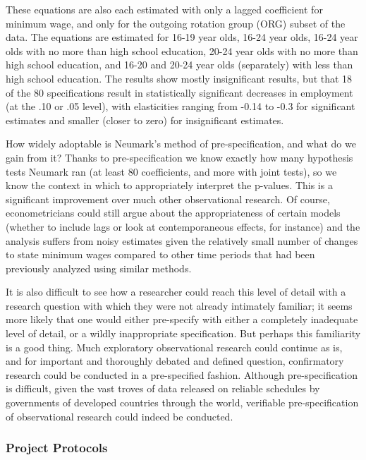 \documentclass[12pt] {article}
\begin{document}
These equations are also each estimated with only a lagged coefficient for minimum wage, and only for the outgoing rotation group (ORG) subset of the data. The equations are estimated for 16-19 year olds, 16-24 year olds, 16-24 year olds with no more than high school education, 20-24 year olds with no more than high school education, and 16-20 and 20-24 year olds (separately) with less than high school education. The results show mostly insignificant results, but that 18 of the 80 specifications result in statistically significant decreases in employment (at the .10 or .05 level), with elasticities ranging from -0.14 to -0.3 for significant estimates and smaller (closer to zero) for insignificant estimates. 

How widely adoptable is Neumark's method of pre-specification, and what do we gain from it? Thanks to pre-specification we know exactly how many hypothesis tests Neumark ran (at least 80 coefficients, and more with joint tests), so we know the context in which to appropriately interpret the p-values. This is a significant improvement over much other observational research. Of course, econometricians could still argue about the appropriateness of certain models (whether to include lags or look at contemporaneous effects, for instance) and the analysis suffers from noisy estimates given the relatively small number of changes to state minimum wages compared to other time periods that had been previously analyzed using similar methods.  

It is also difficult to see how a researcher could reach this level of detail with a research question with which they were not already intimately familiar; it seems more likely that one would either pre-specify with either a completely inadequate level of detail, or a wildly inappropriate specification. But perhaps this familiarity is a good thing. Much exploratory observational research could continue as is, and for important and thoroughly debated and defined question, confirmatory research could be conducted in a pre-specified fashion. Although pre-specification is difficult, given the vast troves of data released on reliable schedules by governments of developed countries through the world, verifiable pre-specification of observational research could indeed be conducted.

\subsubsection{Project Protocols}\label{project-protocols}
\end{document}
